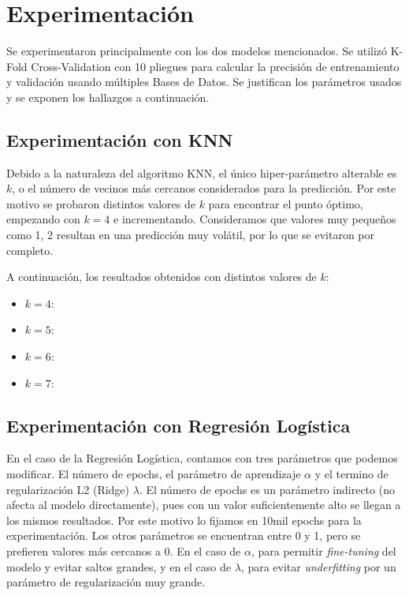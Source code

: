 \documentclass[conference]{IEEEtran}
\begin{document}
\section{Experimentación}
Se experimentaron principalmente con los dos modelos mencionados. Se utilizó K-Fold Cross-Validation con 10 pliegues para calcular la precisión de entrenamiento y validación usando múltiples Bases de Datos. Se justifican los parámetros usados y se exponen los hallazgos a continuación.

\subsection{Experimentación con KNN}
Debido a la naturaleza del algoritmo KNN, el único hiper-parámetro alterable es $k$, o el número de vecinos más cercanos considerados para la predicción. Por este motivo se probaron distintos valores de $k$ para encontrar el punto óptimo, empezando con $k=4$ e incrementando. Consideramos que valores muy pequeños como 1, 2 resultan en una predicción muy volátil, por lo que se evitaron por completo.

A continuación, los resultados obtenidos con distintos valores de $k$:

\begin{itemize}
\item $k=4$:
\item $k=5$:
\item $k=6$:
\item $k=7$:
\end{itemize}

\subsection{Experimentación con Regresión Logística}
En el caso de la Regresión Logística, contamos con tres parámetros que podemos modificar. El número de epochs, el parámetro de aprendizaje $\alpha$ y el termino de regularización L2 (Ridge) $\lambda$. El número de epochs es un parámetro indirecto (no afecta al modelo directamente), pues con un valor suficientemente alto se llegan a los mismos resultados. Por este motivo lo fijamos en 10mil epochs para la experimentación. Los otros parámetros se encuentran entre 0 y 1, pero se prefieren valores más cercanos a 0. En el caso de $\alpha$, para permitir \textit{fine-tuning} del modelo y evitar saltos grandes, y en el caso de $\lambda$, para evitar \textit{underfitting} por un parámetro de regularización muy grande.
\end{document}
